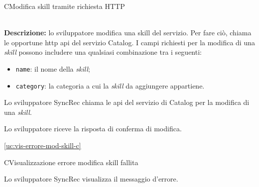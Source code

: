 \begin{usecase}{7}{C}{Modifica skill tramite richiesta HTTP}


	\textbf{\\Descrizione:} lo sviluppatore modifica una skill del servizio. Per fare ciò, chiama le opportune \acrshort{http} \acrshort{api} del servizio Catalog. I campi richiesti per la modifica di una \textit{skill} possono includere una qualsiasi combinazione tra i seguenti:
	\begin{itemize}
		\item \texttt{name}: il nome della \textit{skill};
		\item \texttt{category}: la categoria a cui la \textit{skill} da aggiungere appartiene.
	\end{itemize}

	\begin{ucscenarioprincipale}
		\item Lo sviluppatore SyncRec chiama le \acrshort{api} del servizio di Catalog per la modifica di una \textit{skill}.
		\item Lo sviluppatore riceve la risposta di conferma di modifica.
	\end{ucscenarioprincipale}


	\begin{ucestensioni}
		\item \ref{uc:vis-errore-mod-skill-c}
	\end{ucestensioni}

	\label{uc:mod-skill-http-c}
\end{usecase}

\begin{usecase}{8}{C}{Visualizzazione errore modifica skill fallita}



	\begin{ucscenarioprincipale}
		\item Lo sviluppatore SyncRec visualizza il messaggio d'errore.
	\end{ucscenarioprincipale}


	\label{uc:vis-errore-mod-skill-c}

\end{usecase}


